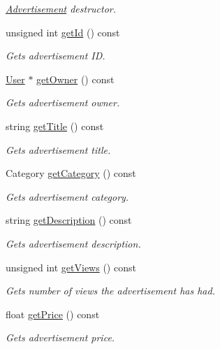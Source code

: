 \begin{DoxyCompactItemize}
\begin{DoxyCompactList}\small\item\em \hyperlink{class_advertisement}{Advertisement} destructor. \end{DoxyCompactList}\item 
unsigned int \hyperlink{class_advertisement_aa66d9158d12ae99a04f81cf2adb155fd}{get\+Id} () const 
\begin{DoxyCompactList}\small\item\em Gets advertisement I\+D. \end{DoxyCompactList}\item 
\hyperlink{class_user}{User} $\ast$ \hyperlink{class_advertisement_a8025c78cb72132ff989fac5c5ddb9cfe}{get\+Owner} () const 
\begin{DoxyCompactList}\small\item\em Gets advertisement owner. \end{DoxyCompactList}\item 
string \hyperlink{class_advertisement_ac65aa68caf2b1697c0cc04f2ebb0fd99}{get\+Title} () const 
\begin{DoxyCompactList}\small\item\em Gets advertisement title. \end{DoxyCompactList}\item 
Category \hyperlink{class_advertisement_a123c05d427fed1ac7fec0f55050da20d}{get\+Category} () const 
\begin{DoxyCompactList}\small\item\em Gets advertisement category. \end{DoxyCompactList}\item 
string \hyperlink{class_advertisement_ac455b4918dbd923af81efbaebf924985}{get\+Description} () const 
\begin{DoxyCompactList}\small\item\em Gets advertisement description. \end{DoxyCompactList}\item 
unsigned int \hyperlink{class_advertisement_a823c798799bcdf75a5b65158d6ad8c96}{get\+Views} () const 
\begin{DoxyCompactList}\small\item\em Gets number of views the advertisement has had. \end{DoxyCompactList}\item 
float \hyperlink{class_advertisement_a6c7a08129880f12744853f9ceeb172ee}{get\+Price} () const 
\begin{DoxyCompactList}\small\item\em Gets advertisement price. \end{DoxyCompactList}\item 

\end{DoxyCompactItemize}
